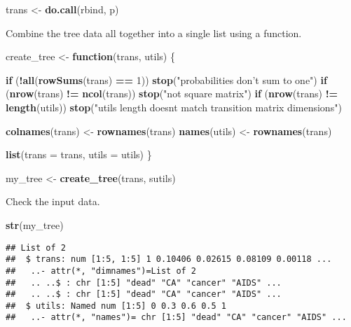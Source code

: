 \documentclass[]{book}
\newenvironment{Shaded}{\begin{snugshade}}{\end{snugshade}}
\newcommand{\ControlFlowTok}[1]{\textcolor[rgb]{0.13,0.29,0.53}{\textbf{#1}}}
\newcommand{\DataTypeTok}[1]{\textcolor[rgb]{0.13,0.29,0.53}{#1}}
\newcommand{\DecValTok}[1]{\textcolor[rgb]{0.00,0.00,0.81}{#1}}
\newcommand{\KeywordTok}[1]{\textcolor[rgb]{0.13,0.29,0.53}{\textbf{#1}}}
\newcommand{\NormalTok}[1]{#1}
\newcommand{\OperatorTok}[1]{\textcolor[rgb]{0.81,0.36,0.00}{\textbf{#1}}}
\newcommand{\StringTok}[1]{\textcolor[rgb]{0.31,0.60,0.02}{#1}}
\begin{document}
\begin{Shaded}
\begin{Highlighting}[]
\NormalTok{trans <-}\StringTok{ }\KeywordTok{do.call}\NormalTok{(rbind, p)}
\end{Highlighting}
\end{Shaded}

Combine the tree data all together into a single list using a function.

\begin{Shaded}
\begin{Highlighting}[]
\NormalTok{create_tree <-}\StringTok{ }\ControlFlowTok{function}\NormalTok{(trans, utils) \{}
  
  \ControlFlowTok{if}\NormalTok{ (}\OperatorTok{!}\KeywordTok{all}\NormalTok{(}\KeywordTok{rowSums}\NormalTok{(trans) }\OperatorTok{==}\StringTok{ }\DecValTok{1}\NormalTok{)) }\KeywordTok{stop}\NormalTok{(}\StringTok{"probabilities don't sum to one"}\NormalTok{)}
  \ControlFlowTok{if}\NormalTok{ (}\KeywordTok{nrow}\NormalTok{(trans) }\OperatorTok{!=}\StringTok{ }\KeywordTok{ncol}\NormalTok{(trans)) }\KeywordTok{stop}\NormalTok{(}\StringTok{"not square matrix"}\NormalTok{)}
  \ControlFlowTok{if}\NormalTok{ (}\KeywordTok{nrow}\NormalTok{(trans) }\OperatorTok{!=}\StringTok{ }\KeywordTok{length}\NormalTok{(utils)) }\KeywordTok{stop}\NormalTok{(}\StringTok{"utils length doesnt match transition matrix dimensions"}\NormalTok{)}
  
  \KeywordTok{colnames}\NormalTok{(trans) <-}\StringTok{ }\KeywordTok{rownames}\NormalTok{(trans)}
  \KeywordTok{names}\NormalTok{(utils) <-}\StringTok{ }\KeywordTok{rownames}\NormalTok{(trans)}
  
  \KeywordTok{list}\NormalTok{(}\DataTypeTok{trans =}\NormalTok{ trans,}
       \DataTypeTok{utils =}\NormalTok{ utils)}
\NormalTok{\}}

\NormalTok{my_tree <-}\StringTok{ }\KeywordTok{create_tree}\NormalTok{(trans, sutils)}
\end{Highlighting}
\end{Shaded}

Check the input data.

\begin{Shaded}
\begin{Highlighting}[]
\KeywordTok{str}\NormalTok{(my_tree)}
\end{Highlighting}
\end{Shaded}

\begin{verbatim}
## List of 2
##  $ trans: num [1:5, 1:5] 1 0.10406 0.02615 0.08109 0.00118 ...
##   ..- attr(*, "dimnames")=List of 2
##   .. ..$ : chr [1:5] "dead" "CA" "cancer" "AIDS" ...
##   .. ..$ : chr [1:5] "dead" "CA" "cancer" "AIDS" ...
##  $ utils: Named num [1:5] 0 0.3 0.6 0.5 1
##   ..- attr(*, "names")= chr [1:5] "dead" "CA" "cancer" "AIDS" ...
\end{verbatim}
\end{document}
